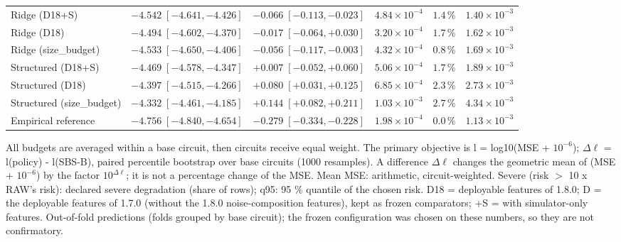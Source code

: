 \begin{table}[p]
\begin{tabular}{lrrrrr}
Ridge (D18+S) & $-4.542\;[-4.641,-4.426]$ & $-0.066\;[-0.113,-0.023]$ & $4.84\times10^{-4}$ & $1.4$\,\% & $1.40\times10^{-3}$ \\
Ridge (D18) & $-4.494\;[-4.602,-4.370]$ & $-0.017\;[-0.064,+0.030]$ & $3.20\times10^{-4}$ & $1.7$\,\% & $1.62\times10^{-3}$ \\
Ridge (size\_budget) & $-4.533\;[-4.650,-4.406]$ & $-0.056\;[-0.117,-0.003]$ & $4.32\times10^{-4}$ & $0.8$\,\% & $1.69\times10^{-3}$ \\
Structured (D18+S) & $-4.469\;[-4.578,-4.347]$ & $+0.007\;[-0.052,+0.060]$ & $5.06\times10^{-4}$ & $1.7$\,\% & $1.89\times10^{-3}$ \\
Structured (D18) & $-4.397\;[-4.515,-4.266]$ & $+0.080\;[+0.031,+0.125]$ & $6.85\times10^{-4}$ & $2.3$\,\% & $2.73\times10^{-3}$ \\
Structured (size\_budget) & $-4.332\;[-4.461,-4.185]$ & $+0.144\;[+0.082,+0.211]$ & $1.03\times10^{-3}$ & $2.7$\,\% & $4.34\times10^{-3}$ \\
\midrule
Empirical reference & $-4.756\;[-4.840,-4.654]$ & $-0.279\;[-0.334,-0.228]$ & $1.98\times10^{-4}$ & $0.0$\,\% & $1.13\times10^{-3}$ \\
\bottomrule
\end{tabular}
\par\vspace{0.5em}
\begin{minipage}{0.97\linewidth}
\footnotesize All budgets are averaged within a base circuit, then circuits receive equal weight. The primary objective is l = log10(MSE + $10^{-6}$); $\Delta\ell$ = l(policy) - l(SBS-B), paired percentile bootstrap over base circuits (1000 resamples). A difference $\Delta\ell$ changes the geometric mean of (MSE + $10^{-6}$) by the factor $10^{\Delta\ell}$; it is not a percentage change of the MSE. Mean MSE: arithmetic, circuit-weighted. Severe (risk $>$ 10 x RAW's risk): declared severe degradation (share of rows); q95: 95 \% quantile of the chosen risk. D18 = deployable features of 1.8.0; D = the deployable features of 1.7.0 (without the 1.8.0 noise-composition features), kept as frozen comparators; +S = with simulator-only features. Out-of-fold predictions (folds grouped by base circuit); the frozen configuration was chosen on these numbers, so they are not confirmatory.
\end{minipage}
\end{table}
